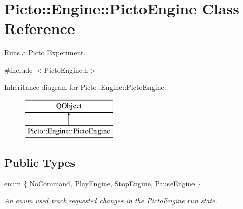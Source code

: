 \hypertarget{class_picto_1_1_engine_1_1_picto_engine}{\section{Picto\-:\-:Engine\-:\-:Picto\-Engine Class Reference}
\label{class_picto_1_1_engine_1_1_picto_engine}
}


Runs a \hyperlink{namespace_picto}{Picto} \hyperlink{class_picto_1_1_experiment}{Experiment}.  




{\ttfamily \#include $<$Picto\-Engine.\-h$>$}

Inheritance diagram for Picto\-:\-:Engine\-:\-:Picto\-Engine\-:\begin{figure}[H]
\begin{center}
\leavevmode
\includegraphics[height=2.000000cm]{class_picto_1_1_engine_1_1_picto_engine}
\end{center}
\end{figure}
\subsection*{Public Types}
\begin{DoxyCompactItemize}
\item 
enum \{ \hyperlink{class_picto_1_1_engine_1_1_picto_engine_aa78bf87cbc1731636a87e4d160b16743a0cce587016bfd65a010de09e30c28b67}{No\-Command}, 
\hyperlink{class_picto_1_1_engine_1_1_picto_engine_aa78bf87cbc1731636a87e4d160b16743a1af554daf8f2be1d6f4ef15e4a1eb770}{Play\-Engine}, 
\hyperlink{class_picto_1_1_engine_1_1_picto_engine_aa78bf87cbc1731636a87e4d160b16743ac37b308257f99b731daa1a4be119e434}{Stop\-Engine}, 
\hyperlink{class_picto_1_1_engine_1_1_picto_engine_aa78bf87cbc1731636a87e4d160b16743acafe1faae866a82ea0e35d710e15d4d4}{Pause\-Engine}
 \}
\begin{DoxyCompactList}\small\item\em An enum used track requested changes in the \hyperlink{class_picto_1_1_engine_1_1_picto_engine}{Picto\-Engine} run state. \end{DoxyCompactList}\end{DoxyCompactItemize}
